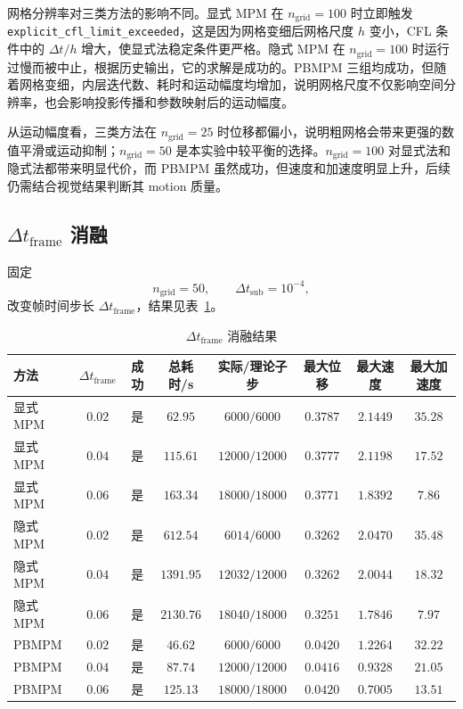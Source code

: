 \documentclass[a4paper]{article}
\begin{document}
网格分辨率对三类方法的影响不同。显式 MPM 在 $n_{\mathrm{grid}}=100$ 时立即触发 \texttt{explicit\_cfl\_limit\_exceeded}，这是因为网格变细后网格尺度 $h$ 变小，CFL 条件中的 $\Delta t/h$ 增大，使显式法稳定条件更严格。隐式 MPM 在 $n_{\mathrm{grid}}=100$ 时运行过慢而被中止，根据历史输出，它的求解是成功的。PBMPM 三组均成功，但随着网格变细，内层迭代数、耗时和运动幅度均增加，说明网格尺度不仅影响空间分辨率，也会影响投影传播和参数映射后的运动幅度。

从运动幅度看，三类方法在 $n_{\mathrm{grid}}=25$ 时位移都偏小，说明粗网格会带来更强的数值平滑或运动抑制；$n_{\mathrm{grid}}=50$ 是本实验中较平衡的选择。$n_{\mathrm{grid}}=100$ 对显式法和隐式法都带来明显代价，而 PBMPM 虽然成功，但速度和加速度明显上升，后续仍需结合视觉结果判断其 motion 质量。

\subsection{$\Delta t_{\mathrm{frame}}$ 消融}

固定
\[
    n_{\mathrm{grid}}=50,\qquad
    \Delta t_{\mathrm{sub}}=10^{-4},
\]
改变帧时间步长 $\Delta t_{\mathrm{frame}}$，结果见表~\ref{tab:frame-dt-ablation}。

\begin{table}[H]
\centering
\caption{$\Delta t_{\mathrm{frame}}$ 消融结果}
\label{tab:frame-dt-ablation}
\small
\begin{tabular}{lccccccc}
\toprule
方法 & $\Delta t_{\mathrm{frame}}$ & 成功 & 总耗时/s & 实际/理论子步 & 最大位移 & 最大速度 & 最大加速度 \\
\midrule
显式 MPM & $0.02$ & 是 & $62.95$ & $6000/6000$ & $0.3787$ & $2.1449$ & $35.28$ \\
显式 MPM & $0.04$ & 是 & $115.61$ & $12000/12000$ & $0.3777$ & $2.1198$ & $17.52$ \\
显式 MPM & $0.06$ & 是 & $163.34$ & $18000/18000$ & $0.3771$ & $1.8392$ & $7.86$ \\
\midrule
隐式 MPM & $0.02$ & 是 & $612.54$ & $6014/6000$ & $0.3262$ & $2.0470$ & $35.48$ \\
隐式 MPM & $0.04$ & 是 & $1391.95$ & $12032/12000$ & $0.3262$ & $2.0044$ & $18.32$ \\
隐式 MPM & $0.06$ & 是 & $2130.76$ & $18040/18000$ & $0.3251$ & $1.7846$ & $7.97$ \\
\midrule
PBMPM & $0.02$ & 是 & $46.62$ & $6000/6000$ & $0.0420$ & $1.2264$ & $32.22$ \\
PBMPM & $0.04$ & 是 & $87.74$ & $12000/12000$ & $0.0416$ & $0.9328$ & $21.05$ \\
PBMPM & $0.06$ & 是 & $125.13$ & $18000/18000$ & $0.0420$ & $0.7005$ & $13.51$ \\
\bottomrule
\end{tabular}
\end{table}
\end{document}
